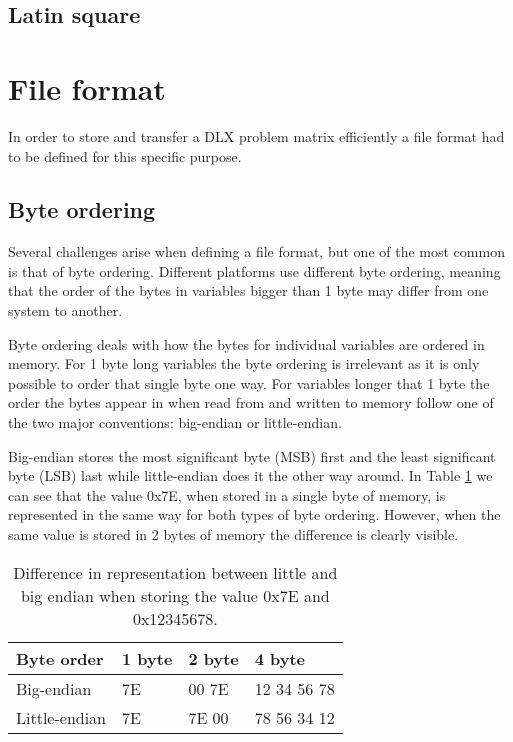 \subsection{Latin square}



\section{File format}

In order to store and transfer a DLX problem matrix efficiently a file format had to be defined for this specific purpose.


\subsection{Byte ordering}

Several challenges arise when defining a file format, but one of the most common is that of byte ordering.
Different platforms use different byte ordering, meaning that the order of the bytes in variables bigger than 1 byte may differ from one system to another.

Byte ordering deals with how the bytes for individual variables are ordered in memory.
For 1 byte long variables the byte ordering is irrelevant as it is only possible to order that single byte one way.
For variables longer that 1 byte the order the bytes appear in when read from and written to memory follow one of the two major conventions: big-endian or little-endian.

Big-endian stores the most significant byte (MSB) first and the least significant byte (LSB) last while little-endian does it the other way around.
In Table \ref{tab:endian} we can see that the value 0x7E, when stored in a single byte of memory, is represented in the same way for both types of byte ordering.
However, when the same value is stored in 2 bytes of memory the difference is clearly visible.


\begin{table}[htbp]
	\centering
	\begin{tabular}{|l||l|l||l|}
		\hline
		\bf Byte order & \bf 1 byte & \bf 2 byte & \bf 4 byte \\ \hline
		Big-endian    & 7E & 00 7E & 12 34 56 78 \\ \hline
		Little-endian & 7E & 7E 00 & 78 56 34 12 \\ \hline
	\end{tabular}
	\caption{Difference in representation between little and big endian when storing the value 0x7E and 0x12345678.}
	\label{tab:endian}
\end{table}


